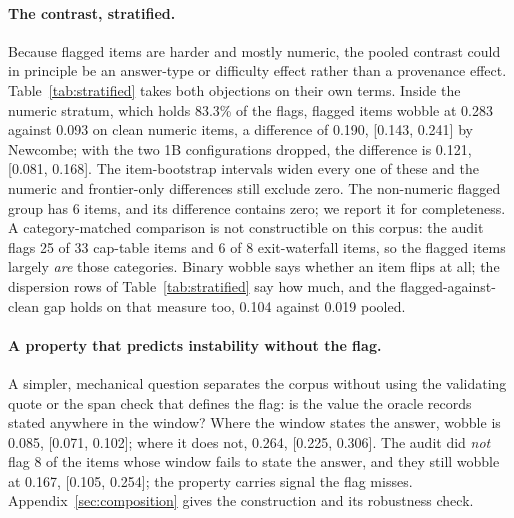 \documentclass[11pt]{article}
\begin{document}


\paragraph{The contrast, stratified.} Because flagged items are harder and mostly numeric, the
pooled contrast could in principle be an answer-type or difficulty effect rather than a provenance
effect. Table~\ref{tab:stratified} takes both objections on their own terms. Inside the numeric
stratum, which holds 83.3\% of the flags, flagged items wobble at 0.283 against 0.093 on clean
numeric items, a difference of 0.190, [0.143, 0.241] by Newcombe; with the two 1B
configurations dropped, the difference is 0.121, [0.081, 0.168]. The item-bootstrap intervals widen
every one of these and the numeric and frontier-only differences still exclude zero. The
non-numeric flagged group has 6 items, and its difference contains zero; we report it for
completeness. A category-matched comparison is not constructible on this corpus: the audit flags
25 of 33 cap-table items and 6 of 8 exit-waterfall items, so the flagged items largely \emph{are}
those categories. Binary wobble says whether an item flips at all; the dispersion rows of
Table~\ref{tab:stratified} say how much, and the flagged-against-clean gap holds on that measure
too, 0.104 against 0.019 pooled.

\paragraph{A property that predicts instability without the flag.} A simpler, mechanical question
separates the corpus without using the validating quote or the span check that defines the flag:
is the value the oracle records stated anywhere in the window? Where the window states the answer,
wobble is 0.085, [0.071, 0.102]; where it does not, 0.264, [0.225, 0.306]. The audit did \emph{not}
flag 8 of the items whose window fails to state the answer, and they still wobble at 0.167,
[0.105, 0.254]; the property carries signal the flag misses. Appendix~\ref{sec:composition}
gives the construction and its robustness check.
\end{document}
